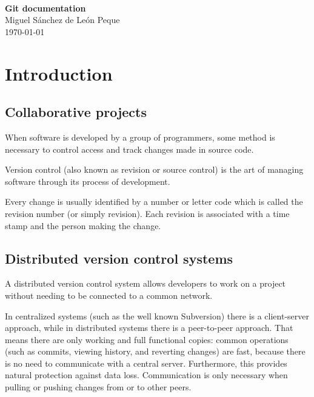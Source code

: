 \documentclass[a4paper,10pt]{article}
\begin{document}
\begin{titlepage}
\begin{center}
	\ \\%
	\vspace{8.0cm}
	\LARGE{\textbf{Git documentation}} \\
	\vspace{1.0cm}
	\Large{Miguel Sánchez de León Peque} \\
	\vspace{0.5cm}
	\large{\today}
\end{center}
\end{titlepage}
\thispagestyle{empty}
\cleardoublepage



\tableofcontents
\cleardoublepage


\listoffigures
\listoftables
\cleardoublepage




\section{Introduction}

\subsection{Collaborative projects}

When software is developed by a group of programmers, some method is
necessary to control access and track changes made in source code.

Version control (also known as revision or source control) is the art of
managing software through its process of development.

Every change is usually identified by a number or letter code which is
called the revision number (or simply revision). Each revision is
associated with a time stamp and the person making the change.

\subsection{Distributed version control systems}

A distributed version control system allows developers to work on a
project without needing to be connected to a common network.

In centralized systems (such as the well known Subversion) there is a
client-server approach, while in distributed systems there is a
peer-to-peer approach. That means there are only working and full
functional copies: common operations (such as commits, viewing history,
and reverting changes) are fast, because there is no need to communicate
with a central server. Furthermore, this provides natural protection
against data loss. Communication is only necessary when pulling or
pushing changes from or to other peers.
\end{document}
